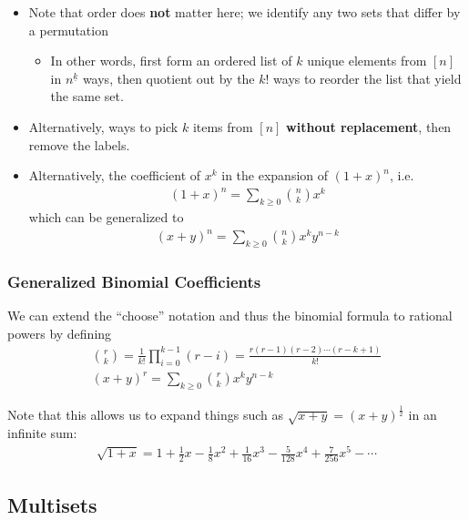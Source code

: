 \begin{itemize}
\tightlist
\item
  Note that order does \textbf{not} matter here; we identify any two
  sets that differ by a permutation

  \begin{itemize}
  \tightlist
  \item
    In other words, first form an ordered list of \(k\) unique elements
    from \([n]\) in \(n^{\underline k}\) ways, then quotient out by the
    \(k!\) ways to reorder the list that yield the same set.
  \end{itemize}
\item
  Alternatively, ways to pick \(k\) items from \([n]\) \textbf{without
  replacement}, then remove the labels.
\item
  Alternatively, the coefficient of \(x^k\) in the expansion of
  \((1+x)^n\), i.e.
  \begin{align*}
  (1+x)^n = \sum_{k\geq 0} {n\choose k} x^k
  \end{align*} which can be generalized to
  \begin{align*}
  (x+y)^n = \sum_{k\geq 0} {n\choose k} x^ky^{n-k}
  \end{align*}
\end{itemize}

\hypertarget{generalized-binomial-coefficients}{%
\subsubsection{Generalized Binomial
Coefficients}\label{generalized-binomial-coefficients}}

We can extend the ``choose'' notation and thus the binomial formula to
rational powers by defining
\begin{align*}
{r \choose k} = \frac{1}{k!} \prod_{i=0}^{k-1} (r - i) = \frac{r(r-1)(r-2)\cdots(r-k+1)}{k!}\\
(x+y)^r = \sum_{k\geq 0} {r\choose k} x^ky^{n-k}
\end{align*}

Note that this allows us to expand things such as
\(\sqrt{x+y} = (x+y)^\frac{1}{2}\) in an infinite sum:
\begin{align*}
\sqrt { 1 + x } = 1 + \frac { 1 } { 2 } x - \frac { 1 } { 8 } x ^ { 2 } + \frac { 1 } { 16 } x ^ { 3 } - \frac { 5 } { 128 } x ^ { 4 } + \frac { 7 } { 256 } x ^ { 5 } - \cdots
\end{align*}

\hypertarget{multisets}{%
\subsection{Multisets}\label{multisets}}

